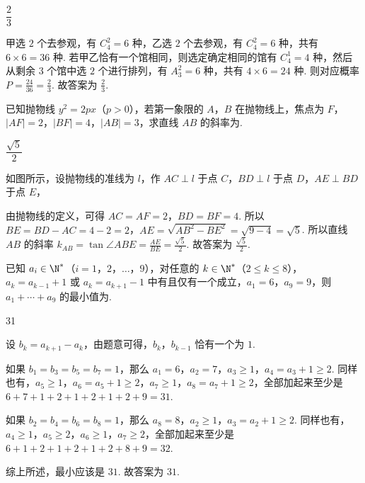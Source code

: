 \begin{answer}
\(\dfrac23\)
\end{answer}

\begin{solution}
甲选 \(2\) 个去参观，有 \(C_4^2=6\) 种，乙选 \(2\) 个去参观，有 \(C_4^2=6\) 种，共有 \(6\times 6=36\) 种. 若甲乙恰有一个馆相同，则选定确定相同的馆有 \(C_4^1=4\) 种，然后从剩余 \(3\) 个馆中选 \(2\) 个进行排列，有 \(A_3^2=6\) 种，共有 \(4\times 6=24\) 种. 则对应概率 \(P=\frac{24}{36}=\frac23\). 故答案为 \(\frac23\).
\end{solution}

\begin{problem}
已知抛物线 \(y^2=2px\)（\(p>0\)），若第一象限的 \(A\)，\(B\) 在抛物线上，焦点为 \(F\)，\(|AF|=2\)，\(|BF|=4\)，\(|AB|=3\)，求直线 \(AB\) 的斜率为\fillinblank{}.
\end{problem}

\begin{answer}
\(\dfrac{\sqrt5}{2}\)
\end{answer}

\begin{solution}
如图所示，设抛物线的准线为 \(l\)，作 \(AC\perp l\) 于点 \(C\)，\(BD\perp l\) 于点 \(D\)，\(AE\perp BD\) 于点 \(E\)，


由抛物线的定义，可得 \(AC=AF=2\)，\(BD=BF=4\). 所以 \(BE=BD-AC=4-2=2\)，\(AE=\sqrt{AB^2-BE^2}=\sqrt{9-4}=\sqrt5\). 所以直线 \(AB\) 的斜率 \(k_{AB}=\tan \angle ABE=\frac{AE}{BE}=\frac{\sqrt5}{2}\). 故答案为 \(\frac{\sqrt5}{2}\).
\end{solution}

\begin{problem}
已知 \(a_i\in \N^*\)（\(i=1\)，\(2\)，\(\dots\)，\(9\)），对任意的 \(k\in \N^*\)（\(2\le k\le 8\)），\(a_k=a_{k-1}+1\) 或 \(a_k=a_{k+1}-1\) 中有且仅有一个成立，\(a_1=6\)，\(a_9=9\)，则 \(a_1+\cdots+a_9\) 的最小值为\fillinblank{}.
\end{problem}

\begin{answer}
31
\end{answer}

\begin{solution}
设 \(b_k=a_{k+1}-a_k\)，由题意可得，\(b_k\)，\(b_{k-1}\) 恰有一个为 \(1\).

如果 \(b_1=b_3=b_5=b_7=1\)，那么 \(a_1=6\)，\(a_2=7\)，\(a_3\ge 1\)，\(a_4=a_3+1\ge 2\). 同样也有，\(a_5\ge 1\)，\(a_6=a_5+1\ge 2\)，\(a_7\ge 1\)，\(a_8=a_7+1\ge 2\)，全部加起来至少是 \(6+7+1+2+1+2+1+2+9=31\).

如果 \(b_2=b_4=b_6=b_8=1\)，那么 \(a_8=8\)，\(a_2\ge 1\)，\(a_3=a_2+1\ge 2\). 同样也有，\(a_4\ge 1\)，\(a_5\ge 2\)，\(a_6\ge 1\)，\(a_7\ge 2\)，全部加起来至少是 \(6+1+2+1+2+1+2+8+9=32\).

综上所述，最小应该是 \(31\). 故答案为 \(31\).
\end{solution}
